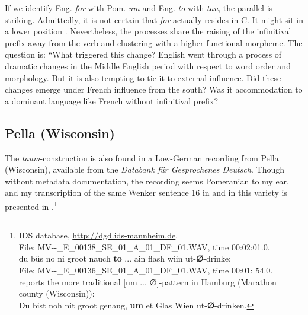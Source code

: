 \documentclass[output=paper,hidelinks,draftmode]{langscibook}
\begin{document}
If we identify Eng. \textit{for} with Pom. \textit{um} and Eng. \textit{to} with \textit{tau}, the parallel is striking. Admittedly, it is not certain that \textit{for} actually resides in C. It might sit in a lower position \citep{Gelderen1998}. Nevertheless, the processes share the raising of the infinitival prefix away from the verb and clustering with a higher functional morpheme. The question is: ``What triggered this change? English went through a process of dramatic changes in the Middle English period with respect to word order and morphology. But it is also tempting to tie it to external influence. Did these changes emerge under French influence from the south? Was it accommodation to a dominant language like French without infinitival prefix?

\subsection{Pella (Wisconsin)}

The \textit{taum}-construction is also found in a Low-German recording from Pella (Wisconsin), available from the \textit{Databank für Gesprochenes Deutsch}. Though without metadata documentation, the recording seems Pomeranian to my ear, and my transcription of the same Wenker sentence 16 in  and  in this variety is presented in .\footnote{IDS database, \url{http://dgd.ids-mannheim.de}.\\
\vspace{-\baselineskip}
\ea File: MV-{}-\_E\_00138\_SE\_01\_A\_01\_DF\_01.WAV, time 00:02:01.0. \\ 
\ex du büs no ni groot nauch \textbf{to} ... ain flash wiin ut-\textbf{∅}{}-drinke: \\File: MV-{}-\_E\_00136\_SE\_01\_A\_01\_DF\_01.WAV, time 00:01: 54.0.\\
\z
\citet[175]{Louden2009} reports the more traditional [um ... ∅]-pattern in Hamburg (Marathon county (Wisconsin)): 
\\ \vspace{-\baselineskip} \ea Du bist noh nit groot genaug, \textbf{um} et Glas Wien ut-\textbf{∅}{}-drinken.
\z}
\end{document}
